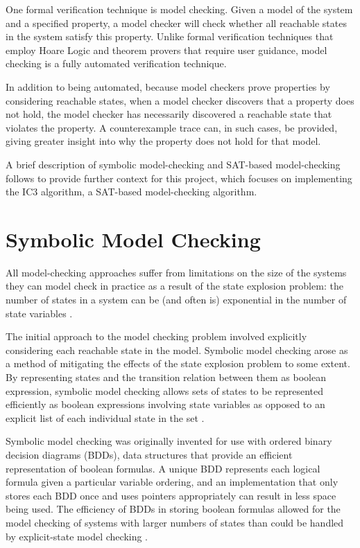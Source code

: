 \documentclass[12pt,a4paper,twoside,openright]{report}
\begin{document}
One formal verification technique is model checking.
Given a model of the system
and a specified property, a model checker will check
whether all reachable states in the system satisfy this property.
Unlike formal verification techniques that employ Hoare Logic
and theorem provers that require user guidance, model checking
is a fully automated verification technique.

In addition to being automated, because model checkers prove
properties by considering reachable states, when a model checker
discovers that a property does not hold, the model checker has
necessarily discovered a reachable state that violates the property.
A counterexample trace can, in such cases, be provided, giving
greater insight into why the property does not hold for that
model.

A brief description of symbolic model-checking and SAT-based model-checking
follows to provide further context for this project, which focuses on
implementing the IC3 algorithm, a SAT-based model-checking algorithm.


\section{Symbolic Model Checking}

All model-checking approaches suffer from limitations on the size
of the systems they can model check in practice as a result of
the state explosion problem: the number of
states in a system can be (and often is) exponential in the
number of state variables \cite{clarke12}. 

The initial approach to the model checking problem involved explicitly
considering each reachable state in the model.
Symbolic model checking arose as a method of mitigating the effects of
the state explosion problem to some extent. By representing
states and the transition relation between them as boolean
expression, symbolic model checking allows sets of states to be
represented efficiently as boolean expressions involving state variables
as opposed to an explicit list of each individual state in the set
\cite{mcmillan92}. 

Symbolic model checking was originally invented for use with ordered
binary decision diagrams (BDDs), data structures that provide an efficient
representation of boolean formulas. A unique BDD represents each logical
formula given a particular variable ordering, and an implementation that
only stores each BDD once and uses pointers appropriately can result in
less space being used.
The efficiency of BDDs in storing boolean formulas allowed for the model
checking of systems with larger numbers of states than could be handled
by explicit-state model checking \cite{mcmillan92}.
\end{document}
